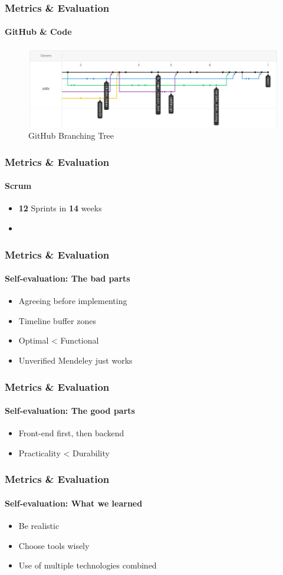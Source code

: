 \documentclass{beamer}
\begin{document}
\begin{frame}
\frametitle{Metrics \& Evaluation}
\framesubtitle{GitHub \& Code}
	\begin{figure}
		\includegraphics[scale=0.3]{./images/github_tree.png}
		\caption{GitHub Branching Tree}
	\end{figure}
\end{frame}

\begin{frame}
\frametitle{Metrics \& Evaluation}
\framesubtitle{Scrum}
	\begin{itemize}
	 \item \textbf{12} Sprints in \textbf{14} weeks
	 \item 
	\end{itemize}
\end{frame}

\begin{frame}
\frametitle{Metrics \& Evaluation}
\framesubtitle{Self-evaluation: The bad parts}
	\begin{itemize}
	 \item Agreeing before implementing
	 \item Timeline buffer zones
	 \item Optimal < Functional
	 \item Unverified Mendeley just works
	\end{itemize}
\end{frame}

\begin{frame}
\frametitle{Metrics \& Evaluation}
\framesubtitle{Self-evaluation: The good parts}
	\begin{itemize}
	 \item Front-end first, then backend
	 \item Practicality < Durability
	\end{itemize}
\end{frame}

\begin{frame}
\frametitle{Metrics \& Evaluation}
\framesubtitle{Self-evaluation: What we learned}
	\begin{itemize}
	 \item Be realistic
	 \item Choose tools wisely
	 \item Use of multiple technologies combined
	\end{itemize}
\end{frame}
\end{document}

